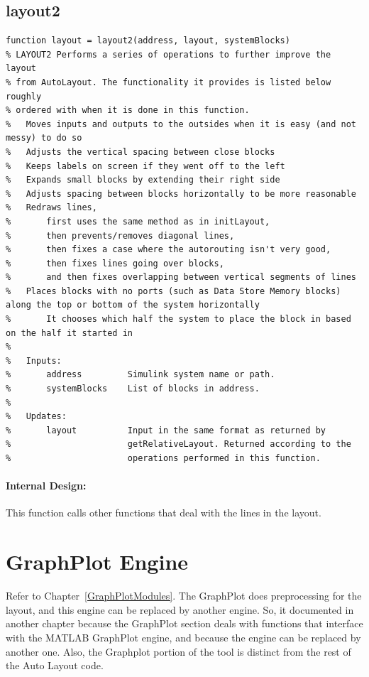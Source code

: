 \documentclass[12pt,letterpaper]{report}
\newcommand{\tool}{Auto Layout\xspace}
\begin{document}
\subsection{layout2}
\begin{lstlisting}
function layout = layout2(address, layout, systemBlocks)
% LAYOUT2 Performs a series of operations to further improve the layout
% from AutoLayout. The functionality it provides is listed below roughly 
% ordered with when it is done in this function.
%   Moves inputs and outputs to the outsides when it is easy (and not messy) to do so
%   Adjusts the vertical spacing between close blocks
%   Keeps labels on screen if they went off to the left
%   Expands small blocks by extending their right side
%   Adjusts spacing between blocks horizontally to be more reasonable
%   Redraws lines,
%       first uses the same method as in initLayout,
%       then prevents/removes diagonal lines,
%       then fixes a case where the autorouting isn't very good,
%       then fixes lines going over blocks,
%       and then fixes overlapping between vertical segments of lines
%   Places blocks with no ports (such as Data Store Memory blocks) along the top or bottom of the system horizontally
%       It chooses which half the system to place the block in based on the half it started in
%
%   Inputs:
%       address         Simulink system name or path.
%       systemBlocks    List of blocks in address.
%
%   Updates:
%       layout          Input in the same format as returned by 
%                       getRelativeLayout. Returned according to the
%                       operations performed in this function.
\end{lstlisting}
\paragraph{Internal Design:} This function calls other functions that deal with the lines in the layout.


\section{GraphPlot Engine}
\par Refer to Chapter~\ref{GraphPlotModules}. The GraphPlot does preprocessing for the layout, and this engine can be replaced by another engine. So, it documented in another chapter because the GraphPlot section deals with functions that interface with the MATLAB GraphPlot engine, and  because the engine can be replaced by another one. Also, the Graphplot portion of the tool is distinct from the rest of the \tool code.
\end{document}
